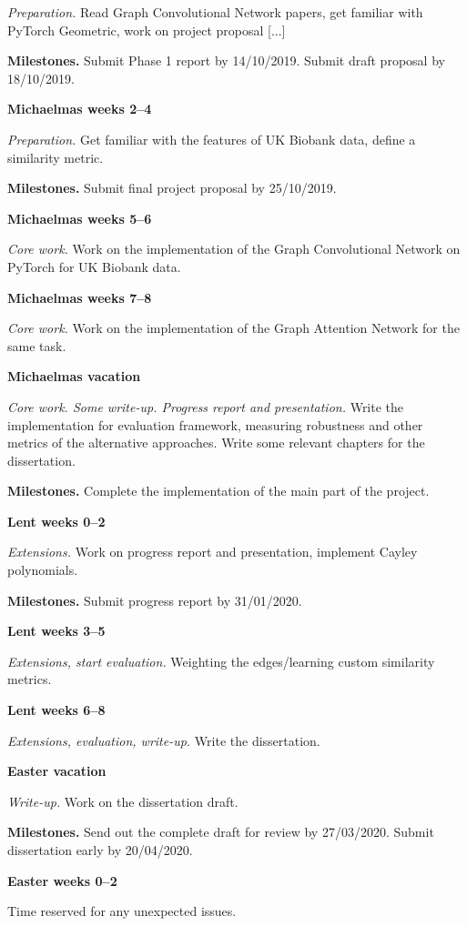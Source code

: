 \documentclass[12pt,a4paper,twoside]{article}
\begin{document}
\textit{Preparation.} Read Graph Convolutional Network papers, get familiar with PyTorch Geometric, work on project proposal [...]

\textbf{Milestones.} Submit Phase 1 report by 14/10/2019. Submit draft proposal by 18/10/2019.

\textbf{Michaelmas weeks 2–4}

\textit{Preparation.} Get familiar with the features of UK Biobank data, define a similarity metric.

\textbf{Milestones.} Submit final project proposal by 25/10/2019.

\textbf{Michaelmas weeks 5–6}

\textit{Core work.} Work on the implementation of the Graph Convolutional Network on PyTorch for UK Biobank data.

\textbf{Michaelmas weeks 7–8} 

\textit{Core work.} Work on the implementation of the Graph Attention Network for the same task.

\textbf{Michaelmas vacation}

\textit{Core work. Some write-up. Progress report and presentation.}  Write the implementation for evaluation framework, measuring robustness and other metrics of the alternative approaches. Write some relevant chapters for the dissertation.

\textbf{Milestones.} Complete the implementation of the main part of the project.

\textbf{Lent weeks 0–2}

\textit{Extensions.} Work on progress report and presentation, implement Cayley polynomials.
 
\textbf{Milestones.} Submit progress report by 31/01/2020.


\textbf{Lent weeks 3–5}

\textit{Extensions, start evaluation.} Weighting the edges/learning custom similarity metrics.

\textbf{Lent weeks 6–8}

\textit{Extensions, evaluation, write-up.} Write the dissertation.

\textbf{Easter vacation}

\textit{Write-up.} Work on the dissertation draft.

\textbf{Milestones.} Send out the complete draft for review by 27/03/2020. Submit dissertation early by 20/04/2020.

\textbf{Easter weeks 0–2}

 Time reserved for any unexpected issues.



\end{document}
